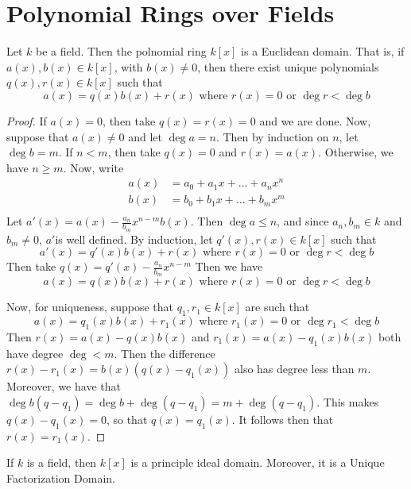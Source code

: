 \section{Polynomial Rings over Fields}
\label{section_7.4}

\begin{theorem}\label{theorem_7.4.1}
  Let $k$ be a field. Then the polnomial ring $k[x]$ is a Euclidean domain.
  That is, if $a(x),b(x) \in k[x]$, with $b(x) \neq 0$, then there exist
  unique polynomials $q(x), r(x) \in k[x]$ such that
  \begin{equation*}
    a(x)=q(x)b(x)+r(x) \text{ where } r(x)=0 \text{ or } \deg{r}<\deg{b}
  \end{equation*}
\end{theorem}
\begin{proof}
  If $a(x)=0$, then take $q(x)=r(x)=0$ and we are done. Now, suppose that
  $a(x) \neq 0$ and let $\deg{a}=n$. Then by induction on $n$, let
  $\deg{b}=m$. If $n<m$, then take  $q(x)=0$ and $r(x)=a(x)$. Otherwise, we
  have $n \geq m$. Now, write
  \begin{align*}
    a(x)    &=  a_0+a_1x+\dots+a_nx^n   \\
    b(x)    &=  b_0+b_1x+\dots+b_mx^m   \\
  \end{align*}
  Let $a'(x)=a(x)-\frac{a_n}{b_m}x^{n-m}b(x)$. Then $\deg{a} \leq n$, and
  since $a_n,b_m \in k$ and  $b_m \neq 0$,  $a'$is well defined. By induction,
  let  $q'(x),r(x) \in k[x]$ such that
  \begin{equation*}
    a'(x)=q'(x)b(x)+r(x) \text{ where } r(x)=0 \text{ or } \deg{r}<\deg{b}
  \end{equation*}
  Then take $q(x)=q'(x)-\frac{a_n}{b_m}x^{n-m}$ Then we have
  \begin{equation*}
    a(x)=q(x)b(x)+r(x) \text{ where } r(x)=0 \text{ or } \deg{r}<\deg{b}
  \end{equation*}

  Now, for uniqueness, suppose that $q_1,r_1 \in k[x]$ are such that
  \begin{equation*}
    a(x)=q_1(x)b(x)+r_1(x) \text{ where } r_1(x)=0 \text{ or } \deg{r_1}<\deg{b}
  \end{equation*}
  Then $r(x)=a(x)-q(x)b(x)$ and $r_1(x)=a(x)-q_1(x)b(x)$ both have degree
  $\deg<m$. Then the difference  $r(x)-r_1(x)=b(x)(q(x)-q_1(x))$ also has
  degree less than $m$. Moreover, we have that
  $\deg{b(q-q_1)}=\deg{b}+\deg{(q-q_1)}=m+\deg{(q-q_1)}$. This makes
  $q(x)-q_1(x)=0$, so that $q(x)=q_1(x)$. It follows then that $r(x)=r_1(x)$.
\end{proof}
\begin{corollary}
  If $k$ is a field, then $k[x]$ is a principle ideal domain. Moreover, it is
  a Unique Factorization Domain.
\end{corollary}

